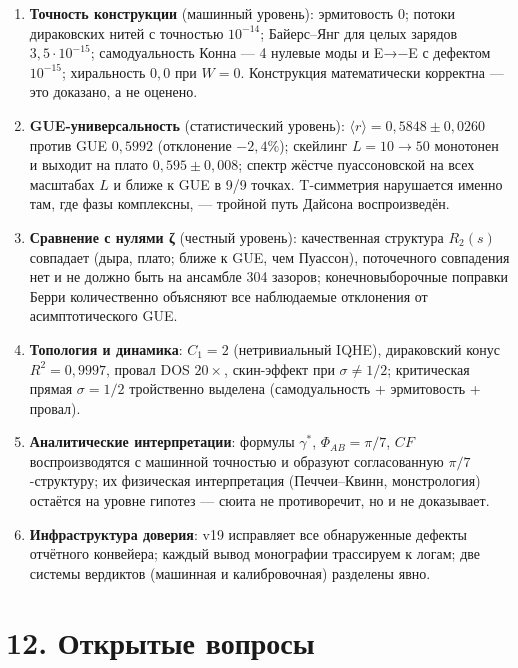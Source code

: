 \documentclass[
]{article}
\providecommand{\tightlist}{%
  \setlength{\itemsep}{0pt}\setlength{\parskip}{0pt}}
\begin{document}
\begin{enumerate}
\def\labelenumi{\arabic{enumi}.}
\tightlist
\item
  \textbf{Точность конструкции} (машинный уровень): эрмитовость 0;
  потоки дираковских нитей с точностью \(10^{-14}\); Байерс--Янг для
  целых зарядов \(3{,}5\cdot10^{-15}\); самодуальность Конна --- 4
  нулевые моды и E→−E с дефектом \(10^{-15}\); хиральность \(0{,}0\) при
  \(W=0\). Конструкция математически корректна --- это доказано, а не
  оценено.
\item
  \textbf{GUE-универсальность} (статистический уровень):
  \(\langle r\rangle = 0{,}5848\pm0{,}0260\) против GUE \(0{,}5992\)
  (отклонение \(-2{,}4\%\)); скейлинг \(L=10\to50\) монотонен и выходит
  на плато \(0{,}595\pm0{,}008\); спектр жёстче пуассоновской на всех
  масштабах \(L\) и ближе к GUE в 9/9 точках. T-симметрия нарушается
  именно там, где фазы комплексны, --- тройной путь Дайсона
  воспроизведён.
\item
  \textbf{Сравнение с нулями ζ} (честный уровень): качественная
  структура \(R_2(s)\) совпадает (дыра, плато; ближе к GUE, чем
  Пуассон), поточечного совпадения нет и не должно быть на ансамбле 304
  зазоров; конечновыборочные поправки Берри количественно объясняют все
  наблюдаемые отклонения от асимптотического GUE.
\item
  \textbf{Топология и динамика}: \(C_1=2\) (нетривиальный IQHE),
  дираковский конус \(R^2=0{,}9997\), провал DOS \(20\times\),
  скин-эффект при \(\sigma\neq1/2\); критическая прямая \(\sigma=1/2\)
  тройственно выделена (самодуальность + эрмитовость + провал).
\item
  \textbf{Аналитические интерпретации}: формулы \(\gamma^{\ast}\),
  \(\Phi_{AB}=\pi/7\), \(CF\) воспроизводятся с машинной точностью и
  образуют согласованную \(\pi/7\)-структуру; их физическая
  интерпретация (Печчеи--Квинн, монстрология) остаётся на уровне гипотез
  --- сюита не противоречит, но и не доказывает.
\item
  \textbf{Инфраструктура доверия}: v19 исправляет все обнаруженные
  дефекты отчётного конвейера; каждый вывод монографии трассируем к
  логам; две системы вердиктов (машинная и калибровочная) разделены
  явно.
\end{enumerate}

\section{12. Открытые
вопросы}\label{ux43eux442ux43aux440ux44bux442ux44bux435-ux432ux43eux43fux440ux43eux441ux44b}
\end{document}
